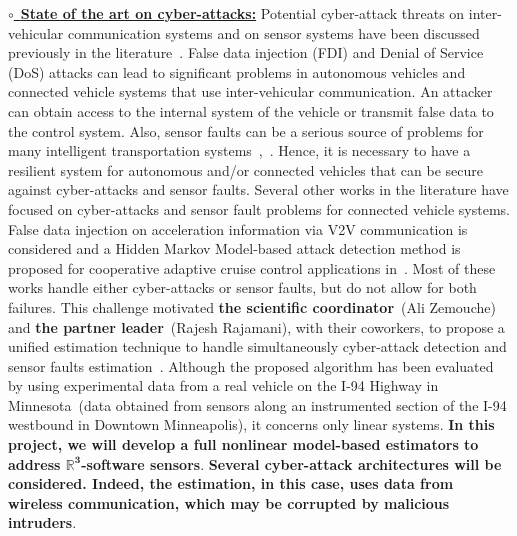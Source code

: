 \documentclass[a4paper,11pt]{article}
\begin{document}
\noindent
\underline{$\circ$~\bf State of the art on cyber-attacks:} Potential cyber-attack threats on inter-vehicular communication systems and on sensor systems have been discussed previously in the literature~\cite{Parkinson_7872388}. False data injection (FDI) and Denial of Service (DoS) attacks can lead to significant problems in autonomous vehicles and connected vehicle systems that use inter-vehicular communication. An attacker can obtain access to the internal system of the vehicle or transmit false data to the control system. Also, sensor faults can be a serious source of problems for many intelligent transportation systems~\cite{oh2018functional_proba_Microsys_Techno},~\cite{Boukhari_18061893}. Hence, it is necessary to have a resilient system for autonomous and/or connected vehicles that can be secure against cyber-attacks and sensor faults.
Several other works in the literature have focused on cyber-attacks and sensor fault problems for connected vehicle systems. False data injection on acceleration information via V2V communication is considered and a Hidden Markov Model-based attack detection method is proposed for cooperative adaptive cruise control applications in~\cite{Matthew_10.1145/3212480.3212492}. Most of these works handle either cyber-attacks or sensor faults, but do not allow for both failures. This challenge motivated {\bf the scientific coordinator}~({Ali \sc Zemouche}) and {\bf the partner leader}~(Rajesh {\sc Rajamani}), with their coworkers, to propose a unified estimation technique to handle simultaneously cyber-attack detection and sensor faults estimation~\cite{Jeon_10.1115/DSCC2019-9096}. Although the proposed algorithm has been evaluated by using experimental data from a real vehicle on the I-94 Highway in Minnesota~(data obtained from sensors along an instrumented section of the I-94 westbound in Downtown Minneapolis), it concerns only linear systems. {\bf In this project, we will develop a full nonlinear model-based estimators to address $\pmb{\mathbb{R}^{3}}$-software sensors}. {\bf Several cyber-attack architectures will be considered. Indeed, the estimation, in this case, uses data from wireless communication, which may be corrupted by malicious intruders}.







\end{document}
